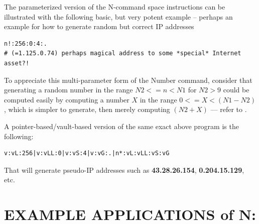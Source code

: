 \documentclass[a4paper, 18pt]{book} %
\begin{document}
\vspace{2em}

The parameterized version of the N-command space instructions can be illustrated with the following basic, but very potent example – perhaps an example for how to generate random but correct IP addresses


  \begin{tcolorbox}[teaterminalstyle, title=N: EXAMPLE 2: GENERATE IP ADDRESSES, breakable]
  \begin{lstlisting}[language=TEA,breaklines=true,]
n!:256:0:4:.
# (=1.125.0.74) perhaps magical address to some *special* Internet asset?! 
   \end{lstlisting}
  \end{tcolorbox}



\vspace{2em}


To appreciate this multi-parameter form of the Number command, consider that generating a random number in the range $N2 <= n < N1$ for $N2 > 9$ could be computed easily by computing a number $X$ in the range $0 <= X < (N1 - N2)$, which is simpler to generate, then merely computing $(N2 + X)$  --- refer to \cite{lutalo2024tea}.

\vspace{2em}


A pointer-based/vault-based version of the same exact above program is the following:



  \begin{tcolorbox}[teaterminalstyle, title=N: EXAMPLE 3: IP ADDRESS GENERATOR PARAMETRIC METHOD, breakable]
  \begin{lstlisting}[language=TEA,breaklines=true,]
v:vL:256|v:vLL:0|v:vS:4|v:vG:.|n*:vL:vLL:vS:vG
   \end{lstlisting}
  \end{tcolorbox}



\vspace{2em}


That will generate pseudo-IP addresses such as \textbf{43.28.26.154}, \textbf{0.204.15.129}, etc.



\section{EXAMPLE APPLICATIONS of N:}
\label{SECEXAMPN}
\end{document}
